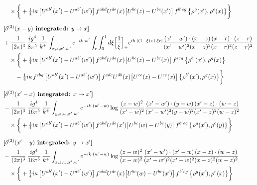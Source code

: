 \documentclass[10pt]{article}
\numberwithin{equation}{section}
\begin{document}
\begin{align}
&\quad\times\bigg\{+\tfrac14 i\kappa\,\big[U^{ab^{\prime}}(x^{\prime})-U^{ab^{\prime}}(w^{\prime})\big]\,f^{abd}U^{de}(x)\big[U^{bc}(z)-U^{bc}(x^{\prime})\big]\,f^{b^{\prime}cg}\,\big\{\rho^{g}(x^{\prime}),\rho^{e}(x)\big\}\bigg\}\notag\\[6pt]
&\textbf{[$\delta^{(2)}(x-y)$ integrated: $y\to x$]}\notag\\
&+\frac{1}{(2\pi)^{3}}\,\frac{ig^{4}}{8\pi^{5}}\,\frac{1}{k^{+}}\int_{x,z,x^{\prime},w^{\prime}}e^{-ik\cdot w^{\prime}}\int_{r}\int_{0}^{1}d\xi\Big[\frac1\xi\Big]_{+}e^{ik\cdot[(1-\xi)z+\xi r]}\frac{(x^{\prime}-w^{\prime})\cdot(x-z)\,(x-r)\cdot(z-r)}{(x^{\prime}-w^{\prime})^{2}(x-z)^{2}(x-r)^{2}(z-r)^{2}}\notag\\
&\quad\times\bigg\{+\tfrac14 i\kappa\,\big[U^{ab^{\prime}}(x^{\prime})-U^{ab^{\prime}}(w^{\prime})\big]\,f^{abd}U^{de}(x)\big[U^{bc}(z)-U^{bc}(x)\big]\,f^{ecg}\,\big\{\rho^{b^{\prime}}(x^{\prime}),\rho^{g}(x)\big\}\notag\\&\qquad-\tfrac14 i\kappa\,f^{ebg}\,\big[U^{ab^{\prime}}(x^{\prime})-U^{ab^{\prime}}(w^{\prime})\big]\,f^{adc}U^{db}(x)\big[U^{ce}(z)-U^{ce}(x)\big]\,\big\{\rho^{b^{\prime}}(x^{\prime}),\rho^{g}(x)\big\}\bigg\}\notag\\[6pt]
&\textbf{[$\delta^{(2)}(x^{\prime}-x)$ integrated: $x\to x^{\prime}$]}\notag\\
&-\frac{1}{(2\pi)^{3}}\,\frac{ig^{4}}{16\pi^{5}}\,\frac{1}{k^{+}}\int_{y,z,w,x^{\prime},w^{\prime}}e^{-ik\cdot(w^{\prime}-w)}\log\frac{(z-w)^{2}}{(x^{\prime}-w)^{2}}\frac{(x^{\prime}-w^{\prime})\cdot(y-w)\,(x^{\prime}-z)\cdot(w-z)}{(x^{\prime}-w^{\prime})^{2}(y-w)^{2}(x^{\prime}-z)^{2}(w-z)^{2}}\notag\\
&\quad\times\bigg\{+\tfrac14 i\kappa\,\big[U^{ab^{\prime}}(x^{\prime})-U^{ab^{\prime}}(w^{\prime})\big]\,f^{abd}U^{de}(x^{\prime})\big[U^{bc}(w)-U^{bc}(y)\big]\,f^{b^{\prime}eg}\,\big\{\rho^{g}(x^{\prime}),\rho^{c}(y)\big\}\bigg\}\notag\\[6pt]
&\textbf{[$\delta^{(2)}(x^{\prime}-y)$ integrated: $y\to x^{\prime}$]}\notag\\
&-\frac{1}{(2\pi)^{3}}\,\frac{ig^{4}}{16\pi^{5}}\,\frac{1}{k^{+}}\int_{x,z,w,x^{\prime},w^{\prime}}e^{-ik\cdot(w^{\prime}-w)}\log\frac{(z-w)^{2}}{(x-w)^{2}}\frac{(x^{\prime}-w^{\prime})\cdot(x^{\prime}-w)\,(x-z)\cdot(w-z)}{(x^{\prime}-w^{\prime})^{2}(x^{\prime}-w)^{2}(x-z)^{2}(w-z)^{2}}\notag\\
&\quad\times\bigg\{+\tfrac14 i\kappa\,\big[U^{ab^{\prime}}(x^{\prime})-U^{ab^{\prime}}(w^{\prime})\big]\,f^{abd}U^{de}(x)\big[U^{bc}(w)-U^{bc}(x^{\prime})\big]\,f^{b^{\prime}cg}\,\big\{\rho^{g}(x^{\prime}),\rho^{e}(x)\big\}\bigg\}\notag\\[6pt]

\end{align}
\end{document}
